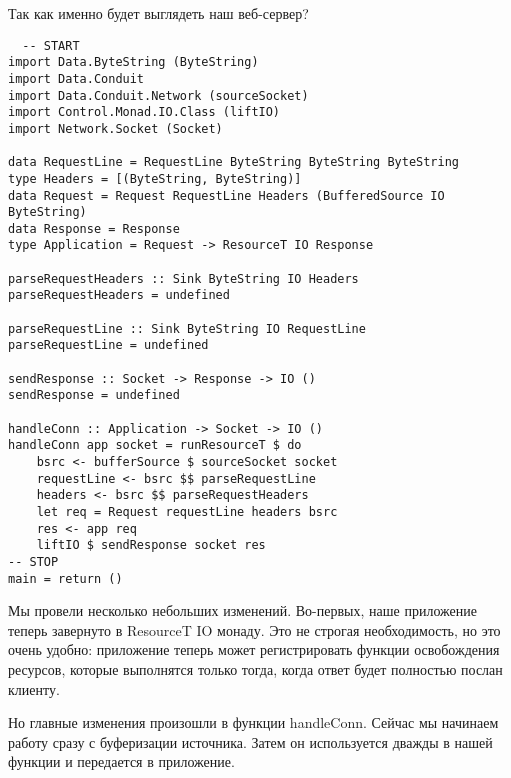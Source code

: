 Так как именно будет выглядеть наш веб-сервер?
\begin{lstlisting}
  -- START
import Data.ByteString (ByteString)
import Data.Conduit
import Data.Conduit.Network (sourceSocket)
import Control.Monad.IO.Class (liftIO)
import Network.Socket (Socket)

data RequestLine = RequestLine ByteString ByteString ByteString
type Headers = [(ByteString, ByteString)]
data Request = Request RequestLine Headers (BufferedSource IO ByteString)
data Response = Response
type Application = Request -> ResourceT IO Response

parseRequestHeaders :: Sink ByteString IO Headers
parseRequestHeaders = undefined

parseRequestLine :: Sink ByteString IO RequestLine
parseRequestLine = undefined

sendResponse :: Socket -> Response -> IO ()
sendResponse = undefined

handleConn :: Application -> Socket -> IO ()
handleConn app socket = runResourceT $ do
    bsrc <- bufferSource $ sourceSocket socket
    requestLine <- bsrc $$ parseRequestLine
    headers <- bsrc $$ parseRequestHeaders
    let req = Request requestLine headers bsrc
    res <- app req
    liftIO $ sendResponse socket res
-- STOP
main = return ()
\end{lstlisting}
Мы провели несколько небольших изменений. Во-первых, наше приложение теперь завернуто в 
ResourceT IO монаду. Это не строгая необходимость, но это очень удобно:
приложение теперь может регистрировать функции освобождения ресурсов, которые выполнятся только тогда, когда ответ будет полностью послан клиенту.

Но главные изменения произошли в функции handleConn. Сейчас мы начинаем работу сразу с буферизации источника. Затем он используется дважды в нашей функции и передается в приложение.

